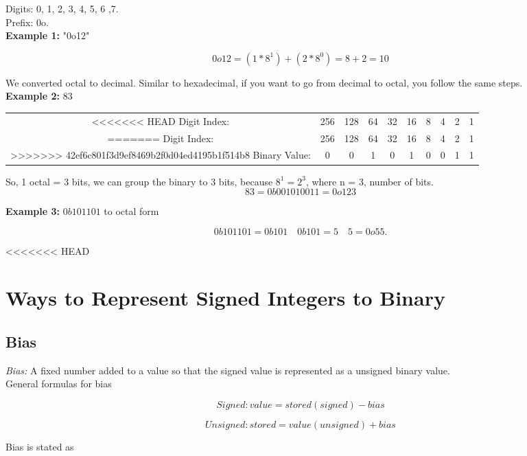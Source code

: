 \documentclass{article}
\begin{document}
\noindent Digits: 0, 1, 2, 3, 4, 5, 6 ,7. \\

\noindent Prefix: 0o. \\

\noindent \textbf{Example 1:} "0o12"

\[
0o12 = (1 * 8^1) + (2 * 8^0) = 8 + 2 = 10
\]

We converted octal to decimal. Similar to hexadecimal, if you want to go from decimal to octal, you follow
the same steps. \\

\noindent \textbf{Example 2:} $83$

\begin{center}
\begin{tabular}{c c c c c c c c c c}
<<<<<<< HEAD
Digit Index: & 256 & 128 & 64 & 32 & 16 & 8 & 4 & 2 & 1 \\ 
=======
Digit Index: & 256 & 128 & 64 & 32 & 16 & 8 & 4 & 2 & 1 \\
>>>>>>> 42ef6c801f3d9ef8469b2f0d04ed4195b1f514b8
Binary Value: & 0 & 0 & 1 & 0 & 1 & 0 & 0 & 1 & 1 \\
\end{tabular}
\end{center}

So, 1 octal = 3 bits, we can group the binary to 3 bits, because $8^1 = 2^3$, where n = 3, number 
of bits.
\[
83 = 0b001 010 011 = 0o123
\]

\noindent \textbf{Example 3:} $0b101101$ to octal form

\[
0b101101 = 0b101\quad 0b101 = 5\quad 5 = 0o55.
\]

<<<<<<< HEAD
\section{Ways to Represent Signed Integers to Binary}
\subsection*{Bias}
\textit{Bias:} A fixed number added to a value so that the signed value is represented as a unsigned binary value. \\

\noindent General formulas for bias

\[
Signed: value = stored(signed) - bias
\]

\[
Unsigned: stored = value(unsigned)  + bias
\]

\noindent Bias is stated as 
\end{document}
